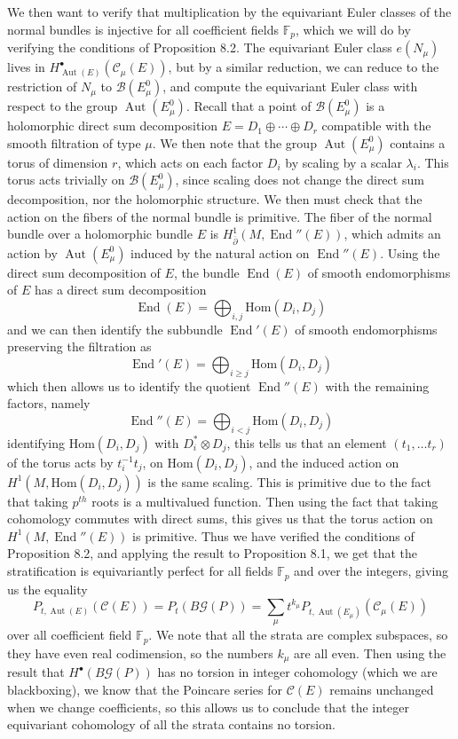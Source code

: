 \documentclass[psamsfonts, 12pt]{amsart}
\theoremstyle{definition}
\theoremstyle{remark}
\renewcommand{\hom}{\mathrm{Hom}}
\newcommand{\F}{\mathbb{F}}
\newcommand{\dbar}{\overline{\partial}}
\newcommand{\inv}{^{-1}}
\DeclareMathOperator{\Aut}{Aut}
\DeclareMathOperator{\End}{End}
\begin{document}
We then want to verify that multiplication by the equivariant Euler classes
of the normal bundles is injective for all coefficient fields $\F_p$, which
we will do by verifying the conditions of Proposition 8.2. The equivariant Euler
class $e(N_\mu)$ lives in $H^\bullet_{\Aut(E)}(\mathscr{C}_\mu(E))$, but by a similar
reduction, we can reduce to the restriction of $N_\mu$ to $\mathscr{B}(E^0_\mu)$,
and compute the equivariant Euler class with respect to the group $\Aut(E_\mu^0)$.
Recall that a point of $\mathscr{B}(E_\mu^0)$ is a holomorphic direct sum
decomposition $E = D_1 \oplus \cdots \oplus D_r$ compatible with the smooth
filtration of type $\mu$. We then note that the group $\Aut(E^0_\mu)$ contains
a torus of dimension $r$, which acts on each factor $D_i$ by scaling by a scalar
$\lambda_i$. This torus acts trivially on $\mathscr{B}(E_\mu^0)$, since scaling
does not change the direct sum decomposition, nor the holomorphic structure. We
then must check that the action on the fibers of the normal bundle is primitive.
The fiber of the normal bundle over a holomorphic bundle $E$ is
$H^1_{\dbar}(M,\End''(E))$, which admits an action by $\Aut(E_\mu^0)$ induced by
the natural action on $\End''(E)$. Using the direct sum decomposition of $E$, the
bundle $\End(E)$ of smooth endomorphisms of $E$ has a direct sum decomposition
\[
\End(E) = \bigoplus_{i,j}\hom(D_i,D_j)
\]
and we can then identify the subbundle $\End'(E)$ of smooth endomorphisms preserving
the filtration as
\[
\End'(E) = \bigoplus_{i \geq j} \hom(D_i,D_j)
\]
which then allows us to identify the quotient $\End''(E)$ with the remaining
factors, namely
\[
\End''(E) = \bigoplus_{i < j}\hom(D_i,D_j)
\]
identifying $\hom(D_i,D_j)$ with $D_i^*\otimes D_j$, this tells us that
an element $(t_1,\ldots t_r)$ of the torus acts by $t_i\inv t_j$,
on $\hom(D_i,D_j)$, and the induced action on $H^1(M,\hom(D_i,D_j))$ is the same
scaling. This is primitive due to the fact that taking $p^{th}$ roots is a multivalued
function. Then using the fact that taking cohomology commutes with direct sums,
this gives us that the torus action on $H^1(M,\End''(E))$ is primitive.
Thus we have verified the conditions of Proposition 8.2, and applying the result
to Proposition 8.1, we get that the stratification is equivariantly perfect for
all fields $\F_p$ and over the integers, giving us the equality
\[
P_{t,\Aut(E)}(\mathscr{C}(E)) = P_t(B\mathscr{G}(P)) =
\sum_\mu t^{k_\mu} P_{t,\Aut(E_\mu)}(\mathscr{C}_\mu(E))
\]
over all coefficient field $\F_p$. We note that all the strata are complex subspaces,
so they have even real codimension, so the numbers $k_\mu$ are all even. Then using the
result that $H^\bullet(B\mathscr{G}(P))$ has no torsion in integer cohomology
(which we are blackboxing), we know that the Poincare series for $\mathscr{C}(E)$
remains unchanged when we change coefficients, so this allows us to conclude that the
integer equivariant cohomology of all the strata contains no torsion. \\
\end{document}
